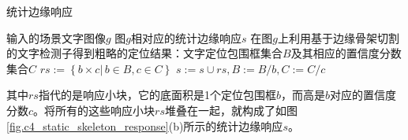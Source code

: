         \begin{algorithm} \renewcommand{\algorithmicrequire}{\textbf{输入:}}	\renewcommand{\algorithmicensure}{\textbf{输出:}}
    	\caption{统计边缘响应}
    	\label{alg:c4_static_skeleton_response}
    	\begin{algorithmic}[1]
    		\REQUIRE 输入的场景文字图像$g$
    		\ENSURE 图$g$相对应的统计边缘响应$s$
            \STATE 在图$g$上利用基于边缘骨架切割的文字检测子得到粗略的定位结果：文字定位包围框集合$B$及其相应的置信度分数集合$C$
    		\REPEAT
            \STATE $rs:=\left\{ b \times c  |\,b \in B, c \in C\right\}$
            \STATE $s:=s\cup rs,B:=B / b,C:=C / c$
    	\end{algorithmic}
        \end{algorithm}
        
        其中$rs$指代的是响应小块，它的底面积是1个定位包围框$b$，而高是$b$对应的置信度分数$c$。将所有的这些响应小块$rs$堆叠在一起，就构成了如图\ref{fig.c4_static_skeleton_response}(b)所示的统计边缘响应$s$。
        
